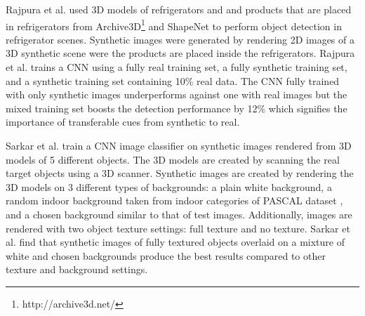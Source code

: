 Rajpura et al. \cite{rajpura2017object} used 3D models of refrigerators and and products that are placed in refrigerators from Archive3D\footnote{http://archive3d.net/} and ShapeNet \cite{chang2015shapenet} to perform object detection in refrigerator scenes. Synthetic images were generated by rendering 2D images of a 3D synthetic scene were the products are placed inside the refrigerators. Rajpura et al. trains a CNN using a fully real training set, a fully synthetic training set, and a synthetic training set containing 10\% real data. The CNN fully trained with only synthetic images  underperforms against one with real images but the mixed training set boosts the detection performance by 12\% which signifies the importance of transferable cues from synthetic to real.

Sarkar et al. \cite{sarkar2017trained} train a CNN image classifier on synthetic images rendered from 3D models of 5 different objects. The 3D models are created by scanning the real target objects using a 3D scanner. Synthetic images are created by rendering the 3D models on 3 different types of backgrounds: a plain white background, a random indoor background taken from indoor categories of PASCAL dataset \cite{everingham2010pascal}, and a chosen background similar to that of test images. Additionally, images are rendered with two object texture settings: full texture and no texture. Sarkar et al. find that synthetic images of fully textured objects overlaid on a mixture of white and chosen backgrounds produce the best results compared to other texture and background settings.
